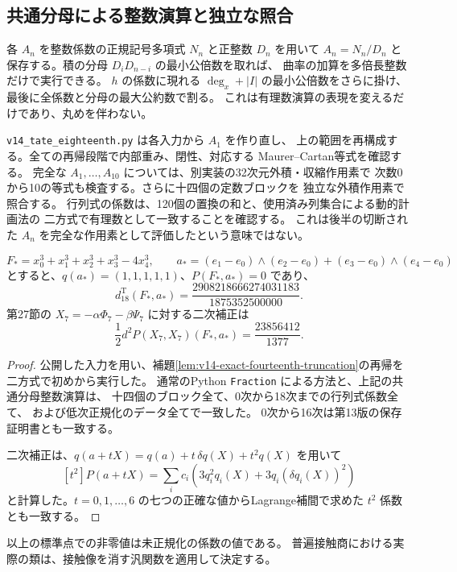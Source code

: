 \subsection{共通分母による整数演算と独立な照合}

各 $A_n$ を整数係数の正規記号多項式 $N_n$ と正整数 $D_n$ を用いて
$A_n=N_n/D_n$ と保存する。積の分母 $D_iD_{n-i}$ の最小公倍数を取れば、
曲率の加算を多倍長整数だけで実行できる。
$h$ の係数に現れる $\deg_x+|I|$ の最小公倍数をさらに掛け、
最後に全係数と分母の最大公約数で割る。
これは有理数演算の表現を変えるだけであり、丸めを伴わない。

\texttt{v14\_tate\_eighteenth.py} は各入力から $A_1$ を作り直し、
上の範囲を再構成する。全ての再帰段階で内部重み、閉性、対応する
Maurer--Cartan等式を確認する。
完全な $A_1,\ldots,A_{10}$ については、別実装の32次元外積・収縮作用素で
次数0から10の等式も検査する。さらに十四個の定数ブロックを
独立な外積作用素で照合する。
行列式の係数は、120個の置換の和と、使用済み列集合による動的計画法の
二方式で有理数として一致することを確認する。
これは後半の切断された $A_n$ を完全な作用素として評価したという意味ではない。

\begin{proposition}[標準点での十八次係数]
\label{prop:v14-standard-eighteenth-value}
\[
 F_*=x_0^3+x_1^3+x_2^3+x_3^3-4x_4^3,
 \qquad
 a_*=(e_1-e_0)\wedge(e_2-e_0)
       +(e_3-e_0)\wedge(e_4-e_0)
\]
とすると、$q(a_*)=(1,1,1,1,1)$、$P(F_*,a_*)=0$ であり、
\[
 d^{\mathrm T}_{18}(F_*,a_*)
     =\frac{2908218666274031183}{1875352500000}.
\]
第27節の $X_7=-\alpha\Phi_7-\beta\Psi_7$ に対する二次補正は
\[
 \frac12d^2P(X_7,X_7)(F_*,a_*)=\frac{23856412}{1377}.
\]
\end{proposition}

\begin{proof}
公開した入力を用い、補題\ref{lem:v14-exact-fourteenth-truncation}の再帰を
二方式で初めから実行した。
通常のPython \texttt{Fraction} による方法と、上記の共通分母整数演算は、
十四個のブロック全て、0次から18次までの行列式係数全て、
および低次正規化のデータ全てで一致した。
0次から16次は第13版の保存証明書とも一致する。

二次補正は、$q(a+tX)=q(a)+t\,\delta q(X)+t^2q(X)$ を用いて
\[
 [t^2]P(a+tX)
  =\sum_i c_i\left(3q_i^2q_i(X)+3q_i(\delta q_i(X))^2\right)
\]
と計算した。$t=0,1,\ldots,6$ の七つの正確な値からLagrange補間で求めた
$t^2$ 係数とも一致する。
\end{proof}

以上の標準点での非零値は未正規化の係数の値である。
普遍接触商における実際の類は、接触像を消す汎関数を適用して決定する。

